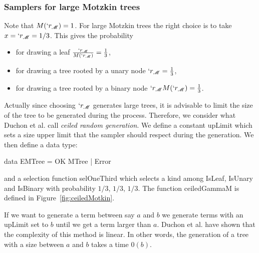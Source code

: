 \documentclass{sig-alternate}
\newcommand{\M}{\mathscr{M}}
\begin{document}
\subsubsection*{Samplers for large Motzkin trees}
Note that $M(`r_\M) = 1$. For large Motzkin trees the right choice is to take $x =
`r_{\M} = 1/3$. This gives the probability
\begin{itemize}
\item for drawing a leaf $\frac{`r_\M}{M(`r_\M)} = \frac{1}{3}$,
\item for drawing a tree rooted by a unary node $`r_\M = \frac{1}{3}$,
\item for drawing a tree rooted by a binary node ${`r_\M M(`r_\M) = \frac{1}{3}}$.
\end{itemize}
Actually since choosing $`r_\M$ generates large trees,  it is advisable to
limit the size of the tree to be generated during the process.  Therefore, we
consider what Duchon et al. call \emph{ceiled random generation}.  We define a
constant \<upLimit\> which sets a size upper limit that the sampler should respect
during the generation.  We then define a data type:
\begin{haskell}
  data EMTree = OK MTree | Error
\end{haskell}
and a selection function \<selOneThird\> which selects a kind among \<IsLeaf\>,
\<IsUnary\> and \<IsBinary\> with probability $1/3$, $1/3$, $1/3$.  The function
\<ceiledGammaM\> is defined in Figure~\ref{fig:ceiledMotkin}.

If we want to generate a term between say $a$ and $b$ we generate terms with an
\<upLimit\> set to $b$ until we get a term larger than $a$.  Duchon et al. have shown
that the complexity of this method is linear. In other words, the generation of a
tree with a size between $a$ and $b$ takes a time $0(b)$.
\end{document}
